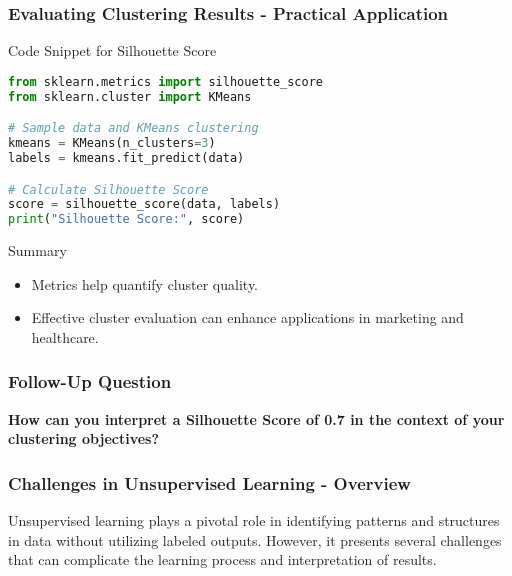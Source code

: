 \documentclass[aspectratio=169]{beamer}
\begin{document}
\begin{frame}[fragile]
    \frametitle{Evaluating Clustering Results - Practical Application}
    \begin{block}{Code Snippet for Silhouette Score}
    \begin{lstlisting}[language=Python]
from sklearn.metrics import silhouette_score
from sklearn.cluster import KMeans

# Sample data and KMeans clustering
kmeans = KMeans(n_clusters=3)
labels = kmeans.fit_predict(data)

# Calculate Silhouette Score
score = silhouette_score(data, labels)
print("Silhouette Score:", score)
    \end{lstlisting}
    \end{block}

    \begin{block}{Summary}
        \begin{itemize}
            \item Metrics help quantify cluster quality.
            \item Effective cluster evaluation can enhance applications in marketing and healthcare.
        \end{itemize}
    \end{block}
\end{frame}

\begin{frame}
    \frametitle{Follow-Up Question}
    \centering
    \textbf{How can you interpret a Silhouette Score of 0.7 in the context of your clustering objectives?}
\end{frame}

\begin{frame}[fragile]
    \frametitle{Challenges in Unsupervised Learning - Overview}
    Unsupervised learning plays a pivotal role in identifying patterns and structures in data without utilizing labeled outputs. However, it presents several challenges that can complicate the learning process and interpretation of results.
\end{frame}
\end{document}

